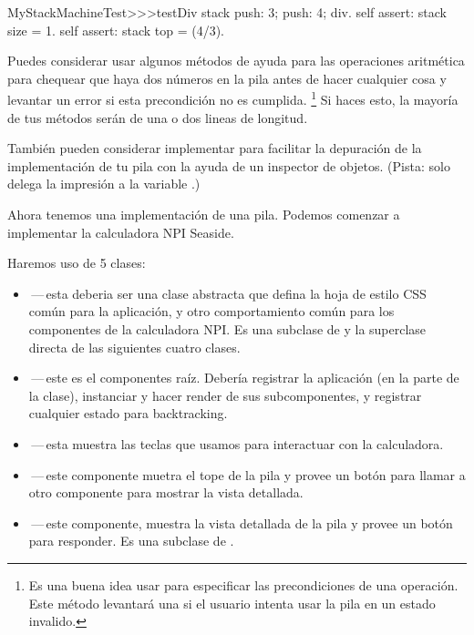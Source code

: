 \documentclass[a4paper,10pt,twoside]{book}
\begin{document}

\begin{code}{}
MyStackMachineTest>>>testDiv
	stack
		push: 3;
		push: 4;
		div.
	self assert: stack size = 1.
	self assert: stack top = (4/3).
\end{code}

Puedes considerar usar algunos m\'etodos de ayuda para las operaciones aritm\'etica para chequear que haya dos n\'umeros en la pila antes de hacer cualquier cosa y levantar un error
si esta precondici\'on no es cumplida. \footnote{Es una buena idea usar  para especificar las precondiciones de una operaci\'on. Este m\'etodo levantar\'a una  si el usuario intenta usar la pila en un estado invalido.}
Si haces esto, la mayor\'ia de tus m\'etodos ser\'an de una o dos lineas de longitud.

Tambi\'en pueden considerar implementar  para facilitar la depuraci\'on de la implementaci\'on de tu pila con la ayuda de un inspector de objetos.
(Pista: solo delega la impresi\'on a la variable .)


Ahora tenemos una implementaci\'on de una pila.
Podemos comenzar a implementar la calculadora NPI Seaside.

Haremos uso de 5 clases:
\begin{itemize}
  \item {}\,---\,esta deberia ser una clase abstracta que defina la hoja de estilo CSS com\'un para la aplicaci\'on, y otro comportamiento com\'un para los componentes de la calculadora NPI.
  Es una subclase de  y la superclase directa de las siguientes cuatro clases. 
    \item {}\,---\,este es el componentes ra\'iz.
  Deber\'ia registrar la aplicaci\'on (en la parte de la clase), instanciar y hacer render de sus subcomponentes, y registrar cualquier estado para backtracking.
  \item {}\,---\,esta muestra las teclas que usamos para interactuar con la calculadora. 
  \item {}\,---\,este componente muetra el tope de la pila y provee un bot\'on para llamar a otro componente para mostrar la vista detallada.
  \item {}\,---\,este componente, muestra la vista detallada de la pila y provee un bot\'on para responder.
  Es una subclase de .
\end{itemize}
\end{document}
